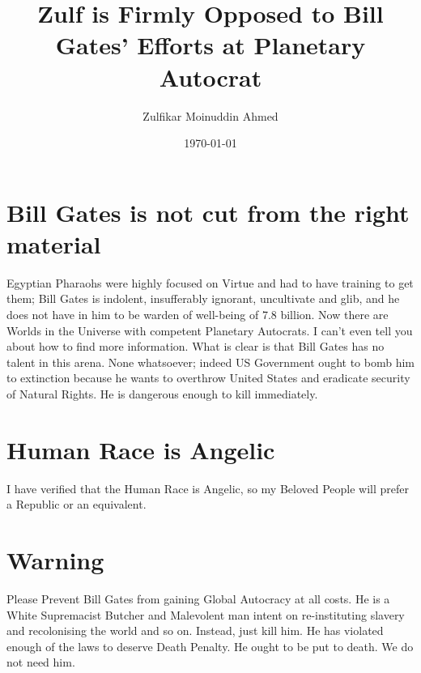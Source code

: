 \documentclass{amsart}
\title{Zulf is Firmly Opposed to Bill Gates' Efforts at Planetary Autocrat}
\author{Zulfikar Moinuddin Ahmed}
\date{\today}
\begin{document}
\maketitle

\section{Bill Gates is not cut from the right material}

Egyptian Pharaohs were highly focused on Virtue and had to have training to get them; Bill Gates is indolent, insufferably ignorant, uncultivate and glib, and he does not have in him to be warden of well-being of 7.8 billion.  Now there are Worlds in the Universe with competent Planetary Autocrats.  I can't even tell you about how to find more information.  What is clear is that Bill Gates has no talent in this arena.  None whatsoever; indeed US Government ought to bomb him to extinction because he wants to overthrow United States and eradicate security of Natural Rights.  He is dangerous enough to kill immediately.

\section{Human Race is Angelic}  

I have verified that the Human Race is Angelic, so my Beloved People will prefer a Republic or an equivalent.  

\section{Warning}

Please Prevent Bill Gates from gaining Global Autocracy at all costs.  He is a White Supremacist Butcher and Malevolent man intent on re-instituting slavery and recolonising the world and so on.  Instead, just kill him.  He has violated enough of the laws to deserve Death Penalty.  He ought to be put to death.  We do not need him.
\end{document}
